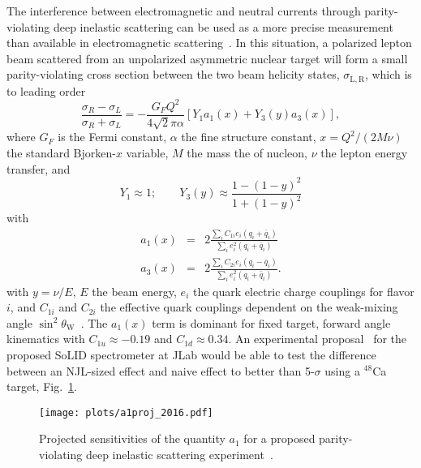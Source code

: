 The interference between electromagnetic and  neutral currents through parity-violating deep inelastic scattering can be used as a more precise measurement than available in electromagnetic scattering~\cite{Cloet:2012td}.  In this situation, a polarized lepton beam scattered from an unpolarized asymmetric nuclear target will form a small parity-violating cross section between the two beam helicity states, $\sigma_{\mathrm{L,R}}$, which is to leading order
\begin{equation}
        \frac{ \sigma_R - \sigma_L }{\sigma_R + \sigma_L} = -\frac{G_F Q^2}{4 \sqrt{2} \pi \alpha} \left[ Y_1 a_1(x) + Y_3(y) a_3(x) \right],
            \label{eq:phy:apv}
\end{equation}
where $G_F$ is the Fermi constant, $\alpha$ the fine structure constant, $x=Q^2/(2M\nu)$ the standard Bjorken-$x$ variable, $M$ the mass the of nucleon, $\nu$ the lepton energy transfer, and
\begin{equation}
        Y_1 \approx 1; \qquad Y_3(y) \approx \frac{1 - (1-y)^2}{1 + (1-y)^2}
    \end{equation}
    with
    \begin{eqnarray}
            a_1(x) & = &  2 \frac{ \sum_i C_{1i} e_i (q_i + \bar{q}_i) }{ \sum_i e_i^2 (q_i + \bar{q}_i) } \\
            a_3(x) & = &  2 \frac{ \sum_i C_{2i} e_i (q_i - \bar{q}_i) }{ \sum_i e_i^2 (q_i + \bar{q}_i) }. 
    \end{eqnarray}
    with $y=\nu/E$,  $E$ the beam energy, $e_i$ the quark electric charge couplings for flavor $i$, and $C_{1i}$ and $C_{2i}$ the effective quark couplings dependent on the weak-mixing angle $\sin^2\theta_\mathrm{W}$~\cite{Patrignani:2016xqp}.  The $a_1(x)$ term is dominant for fixed target, forward angle kinematics with $C_{1u} \approx -0.19$ and $C_{1d} \approx 0.34$.  An experimental proposal~\cite{emcpvdis} for the proposed SoLID spectrometer at JLab would be able to test the difference between an NJL-sized effect and naive effect to better than 5-$\sigma$ using a ${}^{48}$Ca target, Fig.~\ref{fig:ivemc:pvdis}.



    \begin{figure}[tbp]
        \centering\texttt{[image: plots/a1proj\_2016.pdf]}
        \caption{Projected sensitivities of the quantity $a_1$ for a proposed parity-violating deep inelastic scattering experiment~\cite{emcpvdis}.}
        \label{fig:ivemc:pvdis}
    \end{figure}





